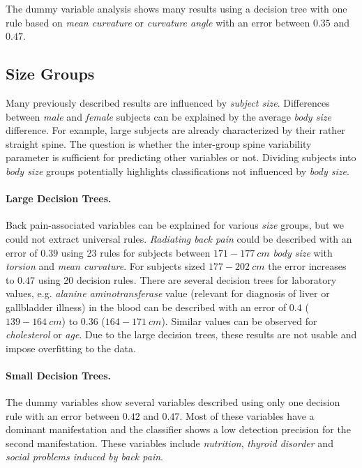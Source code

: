 \documentclass[a4paper,twoside]{style/article}
\begin{document}
The dummy variable analysis shows many results using a decision tree with one rule based on \emph{mean curvature} or \emph{curvature angle} with an error between $0.35$ and $0.47$.
\subsection{Size Groups}
Many previously described results are influenced by \emph{subject size}.
Differences between \emph{male} and \emph{female} subjects can be explained by the average \emph{body size} difference.
For example, large subjects are already characterized by their rather straight spine.
%
The question is whether the inter-group spine variability parameter is sufficient for predicting other variables or not.
Dividing subjects into \emph{body size} groups potentially highlights classifications not influenced by \emph{body size}.
\paragraph{Large Decision Trees. }
Back pain-associated variables can be explained for various \emph{size} groups, but we could not extract universal rules.
\emph{Radiating back pain} could be described with an error of $0.39$ using 23 rules for subjects between \emph{$171-177~cm$ body size} with \emph{torsion} and \emph{mean curvature}.
For subjects sized \emph{$177-202~cm$} the error increases to $0.47$ using 20 decision rules.
There are several decision trees for laboratory values, e.g. \emph{alanine aminotransferase} value (relevant for diagnosis of liver or gallbladder illness) in the blood can be described with an error of $0.4$ (\emph{$139-164~cm$}) to $0.36$ (\emph{$164 - 171~cm$}).
Similar values can be observed for \emph{cholesterol} or \emph{age}.
Due to the large decision trees, these results are not usable and impose overfitting to the data.
\paragraph{Small Decision Trees. }
The dummy variables show several variables described using only one decision rule with an error between $0.42$ and $0.47$.
Most of these variables have a dominant manifestation and the classifier shows a low detection precision for the second manifestation.
These variables include \emph{nutrition}, \emph{thyroid disorder} and \emph{social problems induced by back pain}.
\end{document}
